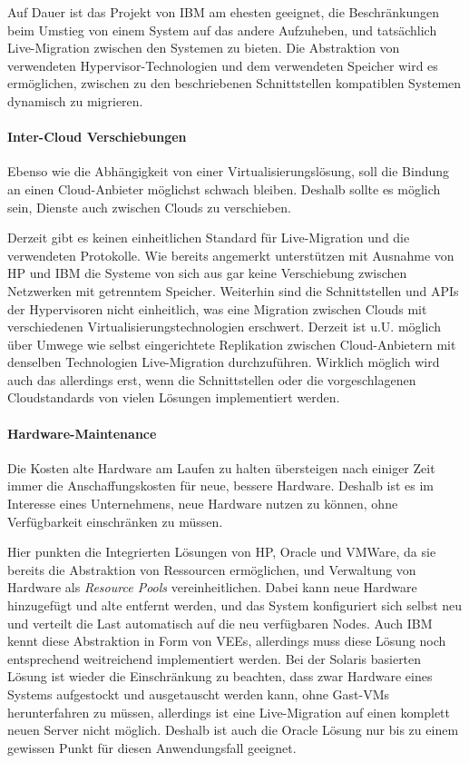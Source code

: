 Auf Dauer ist das \reservoir Projekt von IBM am ehesten geeignet, die
Beschränkungen beim Umstieg von einem System auf das andere
Aufzuheben, und tatsächlich Live-Migration zwischen den Systemen zu
bieten. Die Abstraktion von verwendeten Hypervisor-Technologien und
dem verwendeten Speicher wird es ermöglichen, zwischen zu den
beschriebenen Schnittstellen kompatiblen Systemen dynamisch zu
migrieren.
\paragraph{Inter-Cloud Verschiebungen}
Ebenso wie die Abhängigkeit von einer Virtualisierungslösung, soll die
Bindung an einen Cloud-Anbieter möglichst schwach bleiben. Deshalb
sollte es möglich sein, Dienste auch zwischen Clouds zu verschieben.

Derzeit gibt es keinen einheitlichen Standard für Live-Migration und
die verwendeten Protokolle. Wie bereits angemerkt unterstützen mit
Ausnahme von HP und IBM die Systeme von sich aus gar keine
Verschiebung zwischen Netzwerken mit getrenntem Speicher. Weiterhin
sind die Schnittstellen und APIs der Hypervisoren nicht einheitlich,
was eine Migration zwischen Clouds mit verschiedenen
Virtualisierungstechnologien erschwert. Derzeit ist u.U. möglich über
Umwege wie selbst eingerichtete Replikation zwischen Cloud-Anbietern
mit denselben Technologien Live-Migration durchzuführen. Wirklich
möglich wird auch das allerdings erst, wenn die \reservoir
Schnittstellen oder die vorgeschlagenen Cloudstandards von vielen
Lösungen implementiert werden.
\paragraph{Hardware-Maintenance}
Die Kosten alte Hardware am Laufen zu halten übersteigen nach einiger
Zeit immer die Anschaffungskosten für neue, bessere Hardware. Deshalb
ist es im Interesse eines Unternehmens, neue Hardware nutzen zu
können, ohne Verfügbarkeit einschränken zu müssen.

Hier punkten die Integrierten Lösungen von HP, Oracle und VMWare, da
sie bereits die Abstraktion von Ressourcen ermöglichen, und Verwaltung
von Hardware als \emph{Resource Pools} vereinheitlichen. Dabei kann
neue Hardware hinzugefügt und alte entfernt werden, und das System
konfiguriert sich selbst neu und verteilt die Last automatisch auf die
neu verfügbaren Nodes. Auch IBM kennt diese Abstraktion in Form von
\acp{VEE}, allerdings muss diese Lösung noch entsprechend weitreichend
implementiert werden.  Bei der Solaris basierten Lösung ist wieder die
Einschränkung zu beachten, dass zwar Hardware eines Systems
aufgestockt und ausgetauscht werden kann, ohne Gast-VMs herunterfahren
zu müssen, allerdings ist eine Live-Migration auf einen komplett neuen
Server nicht möglich. Deshalb ist auch die Oracle Lösung nur bis zu
einem gewissen Punkt für diesen Anwendungsfall geeignet.
